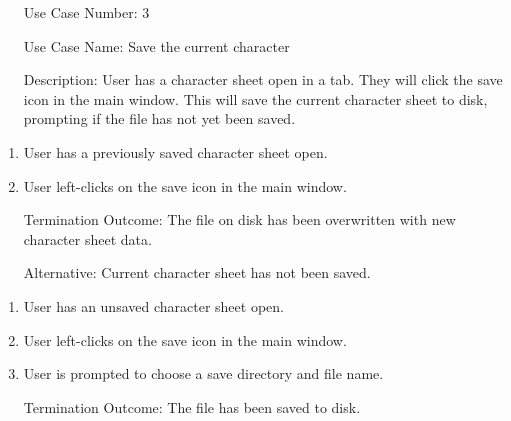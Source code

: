 \documentclass[10pt,conference,onecolumn,compsoc]{IEEEtran}
\begin{document}
\begin{itemize}
\item[Use Case Number:] 3
\item[Use Case Name:] Save the current character
\item[Description:] User has a character sheet open in a tab. They will click the save icon in the main window. This will save the current character sheet to disk, prompting if the file has not yet been saved.
\end{itemize}

\begin{enumerate}
\item User has a previously saved character sheet open.
\item User left-clicks on the save icon in the main window.
\item[Termination Outcome:] The file on disk has been overwritten with new character sheet data.
\end{enumerate}
\begin{itemize}
\item[Alternative:] Current character sheet has not been saved.
\end{itemize}
\begin{enumerate}
\item User has an unsaved character sheet open.
\item User left-clicks on the save icon in the main window.
\item User is prompted to choose a save directory and file name.
\item[Termination Outcome:] The file has been saved to disk.
\end{enumerate}
\end{document}
